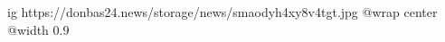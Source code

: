  
 
 
 
 

\ifcmt
  ig https://donbas24.news/storage/news/smaodyh4xy8v4tgt.jpg
  @wrap center
  @width 0.9
\fi
